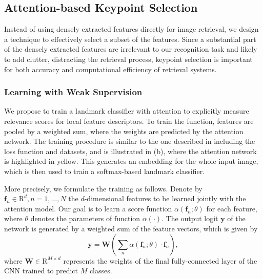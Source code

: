 \documentclass[10pt,twocolumn,letterpaper]{article}
\begin{document}
\subsection{Attention-based Keypoint Selection} \label{subsec:attention}

Instead of using densely extracted features directly for image retrieval, we design a technique to effectively select a subset of the features.
Since a substantial part of the densely extracted features are irrelevant to our recognition task and likely to add clutter, distracting the retrieval process, keypoint selection is important for both accuracy and computational efficiency of retrieval systems.




\subsubsection{Learning with Weak Supervision}

We propose to train a landmark classifier with attention to explicitly measure relevance scores for local feature descriptors.
To train the function, features are pooled by a weighted sum, where the weights are predicted by the attention network.
The training procedure is similar to the one described in  including the loss function and datasets, and is illustrated in (b), where the attention network is highlighted in yellow.
This generates an embedding for the whole input image, which is then used to train a softmax-based landmark classifier.

More precisely, we formulate the training as follows.
Denote by ${\mathbf{f}_n\in\mathrm{R}^d}, n=1,...,N$ the $d$-dimensional features to be learned jointly with the attention model.
Our goal is to learn a score function $\alpha(\mathbf{f}_n ; \theta)$ for each feature, where $\theta$ denotes the parameters of function $\alpha(\cdot)$.
The output logit $\mathbf{y}$ of the network is generated by a weighted sum of the feature vectors, which is given by
\begin{equation}
	\mathbf{y} = \mathbf{W} \left(
	\sum_{n}\alpha(\mathbf{f}_n ; \theta)\cdot\mathbf{f}_n
	\right),
\end{equation}
where $\mathbf{W}\in\mathrm{R}^{M \times d}$ represents the weights of the final fully-connected layer 
of the CNN trained to predict $M$ classes.
\end{document}
